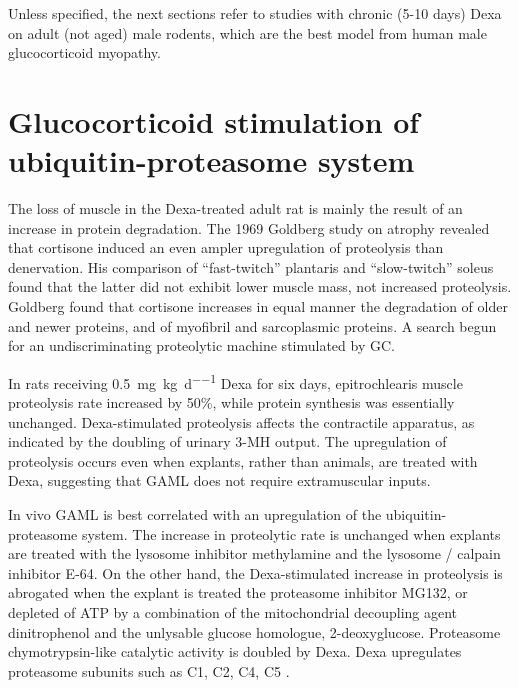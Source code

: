 \documentclass[12pt,english]{report}\usepackage[]{graphicx}\usepackage[]{color}
\begin{document}
Unless specified, the next sections refer to studies with chronic
(5-10 days) Dexa on adult (not aged) male rodents, which are the best
model from human male glucocorticoid myopathy.


\section{Glucocorticoid stimulation of ubiquitin-proteasome system}

The loss of muscle in the Dexa-treated adult rat is mainly the result
of an increase in protein degradation. The 1969 Goldberg study on
atrophy revealed that cortisone induced an even ampler upregulation
of proteolysis than denervation\citep{goldberg1969protein}. His comparison
of ``fast-twitch'' plantaris and ``slow-twitch'' soleus found
that the latter did not exhibit lower muscle mass, not increased proteolysis.
Goldberg found that cortisone increases in equal manner the degradation
of older and newer proteins, and of myofibril and sarcoplasmic proteins.
A search begun for an undiscriminating proteolytic machine stimulated
by GC.

In rats receiving \SI{0.5}{\milli\gram\per\kilo\gram\per\day} Dexa
for six days, epitrochlearis muscle proteolysis rate increased by
50\%, while protein synthesis was essentially unchanged\citep{dardevet1995sensitivity}.
Dexa-stimulated proteolysis affects the contractile apparatus, as
indicated by the doubling of urinary 3-MH output\citep{seene1988effect}.
The upregulation of proteolysis occurs even when explants, rather
than animals, are treated with Dexa, suggesting that GAML does not
require extramuscular inputs\citep{wing1993glucocorticoids}.

In vivo GAML is best correlated with an upregulation of the ubiquitin-proteasome
system. The increase in proteolytic rate is unchanged when explants
are treated with the lysosome inhibitor methylamine and the lysosome
/ calpain inhibitor E-64. On the other hand, the Dexa-stimulated increase
in proteolysis is abrogated when the explant is treated the proteasome
inhibitor MG132\citep{combaret2004glucocorticoids}, or depleted of
ATP by a combination of the mitochondrial decoupling agent dinitrophenol
and the unlysable glucose homologue, 2-deoxyglucose\citep{tiao1996energy-ubiquitin-dependent}.
Proteasome chymotrypsin-like catalytic activity is doubled by Dexa\citep{gilson2007myostatin}.
Dexa upregulates proteasome subunits such as C1, C2, C4, C5 \citep{dardevet1995sensitivity,combaret2004glucocorticoids}. 
\end{document}

